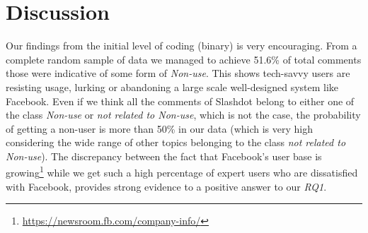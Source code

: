\section{Discussion}
\label{sec:discussion}

Our findings from the initial level of coding (binary) is very encouraging. From a complete random sample of data we managed to achieve 51.6\% of total comments those were indicative of some form of \textit{Non-use}. This shows tech-savvy users are resisting usage, lurking or abandoning a large scale well-designed system like Facebook. Even if we think all the comments of Slashdot belong to either one of the class \textit{Non-use} or \textit{not related to Non-use}, which is not the case, the probability of getting a non-user is more than 50\% in our data (which is very high considering the wide range of other topics belonging to the class \textit{not related to Non-use}). The discrepancy between the fact that Facebook's user base is growing\footnote{\url{https://newsroom.fb.com/company-info/}} while we get such a high percentage of expert users who are dissatisfied with Facebook, provides strong evidence to a positive answer to our \emph{RQ1}. 


